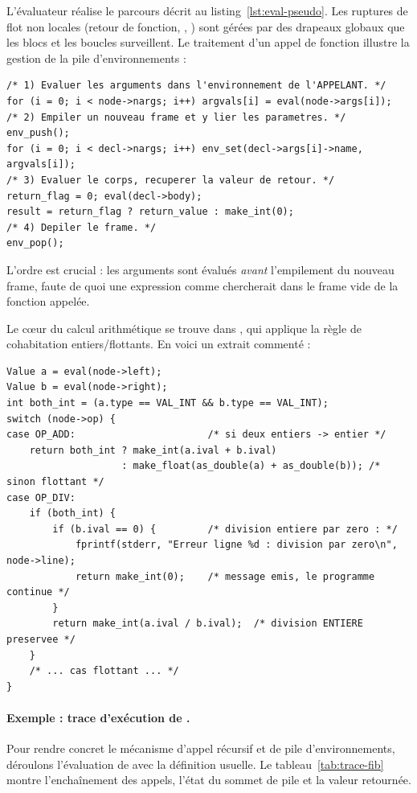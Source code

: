 L'évaluateur réalise le parcours décrit au listing~\ref{lst:eval-pseudo}. Les
ruptures de flot non locales (retour de fonction, , )
sont gérées par des drapeaux globaux que les blocs et les boucles surveillent. Le
traitement d'un appel de fonction illustre la gestion de la pile d'environnements :

\begin{lstlisting}[style=c,caption={Appel de fonction : ordre d'évaluation et pile (extrait de \code{eval.c}).}]
/* 1) Evaluer les arguments dans l'environnement de l'APPELANT. */
for (i = 0; i < node->nargs; i++) argvals[i] = eval(node->args[i]);
/* 2) Empiler un nouveau frame et y lier les parametres. */
env_push();
for (i = 0; i < decl->nargs; i++) env_set(decl->args[i]->name, argvals[i]);
/* 3) Evaluer le corps, recuperer la valeur de retour. */
return_flag = 0; eval(decl->body);
result = return_flag ? return_value : make_int(0);
/* 4) Depiler le frame. */
env_pop();
\end{lstlisting}

L'ordre est crucial : les arguments sont évalués \emph{avant} l'empilement du
nouveau frame, faute de quoi une expression comme  chercherait
 dans le frame vide de la fonction appelée.

Le c\oe ur du calcul arithmétique se trouve dans , qui applique
la règle de cohabitation entiers/flottants. En voici un extrait commenté :

\begin{lstlisting}[style=c,caption={Cohabitation entiers/flottants et garde-fou (extrait de \code{eval.c}).}]
Value a = eval(node->left);
Value b = eval(node->right);
int both_int = (a.type == VAL_INT && b.type == VAL_INT);
switch (node->op) {
case OP_ADD:                       /* si deux entiers -> entier */
    return both_int ? make_int(a.ival + b.ival)
                    : make_float(as_double(a) + as_double(b)); /* sinon flottant */
case OP_DIV:
    if (both_int) {
        if (b.ival == 0) {         /* division entiere par zero : */
            fprintf(stderr, "Erreur ligne %d : division par zero\n", node->line);
            return make_int(0);    /* message emis, le programme continue */
        }
        return make_int(a.ival / b.ival);  /* division ENTIERE preservee */
    }
    /* ... cas flottant ... */
}
\end{lstlisting}

\paragraph{Exemple : trace d'exécution de .} Pour rendre concret le
mécanisme d'appel récursif et de pile d'environnements, déroulons l'évaluation de
 avec la définition usuelle. Le tableau~\ref{tab:trace-fib} montre
l'enchaînement des appels, l'état du sommet de pile et la valeur retournée.

